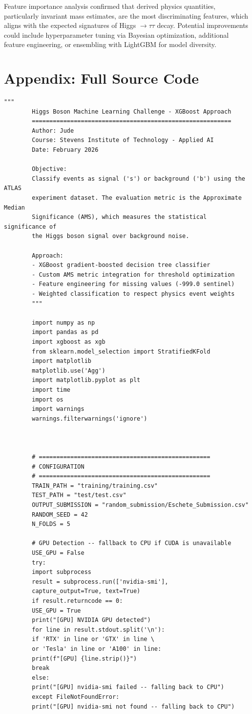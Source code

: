 \documentclass[12pt]{article}
\begin{document}
	Feature importance analysis confirmed that derived physics quantities, particularly invariant mass estimates, are the most discriminating features, which aligns with the expected signatures of Higgs $\rightarrow \tau\tau$ decay. Potential improvements could include hyperparameter tuning via Bayesian optimization, additional feature engineering, or ensembling with LightGBM for model diversity.
	
	\newpage
	\section*{Appendix: Full Source Code}
	
	\begin{lstlisting}[caption={Main.py -- Complete implementation}]
		"""
		Higgs Boson Machine Learning Challenge - XGBoost Approach
		=========================================================
		Author: Jude
		Course: Stevens Institute of Technology - Applied AI
		Date: February 2026
		
		Objective:
		Classify events as signal ('s') or background ('b') using the ATLAS
		experiment dataset. The evaluation metric is the Approximate Median
		Significance (AMS), which measures the statistical significance of
		the Higgs boson signal over background noise.
		
		Approach:
		- XGBoost gradient-boosted decision tree classifier
		- Custom AMS metric integration for threshold optimization
		- Feature engineering for missing values (-999.0 sentinel)
		- Weighted classification to respect physics event weights
		"""
		
		import numpy as np
		import pandas as pd
		import xgboost as xgb
		from sklearn.model_selection import StratifiedKFold
		import matplotlib
		matplotlib.use('Agg')
		import matplotlib.pyplot as plt
		import time
		import os
		import warnings
		warnings.filterwarnings('ignore')
		
		
		
		# =================================================
		# CONFIGURATION
		# =================================================
		TRAIN_PATH = "training/training.csv"
		TEST_PATH = "test/test.csv"
		OUTPUT_SUBMISSION = "random_submission/Eschete_Submission.csv"
		RANDOM_SEED = 42
		N_FOLDS = 5
		
		# GPU Detection -- fallback to CPU if CUDA is unavailable
		USE_GPU = False
		try:
		import subprocess
		result = subprocess.run(['nvidia-smi'],
		capture_output=True, text=True)
		if result.returncode == 0:
		USE_GPU = True
		print("[GPU] NVIDIA GPU detected")
		for line in result.stdout.split('\n'):
		if 'RTX' in line or 'GTX' in line \
		or 'Tesla' in line or 'A100' in line:
		print(f"[GPU] {line.strip()}")
		break
		else:
		print("[GPU] nvidia-smi failed -- falling back to CPU")
		except FileNotFoundError:
		print("[GPU] nvidia-smi not found -- falling back to CPU")
		

\end{lstlisting}
\end{document}
